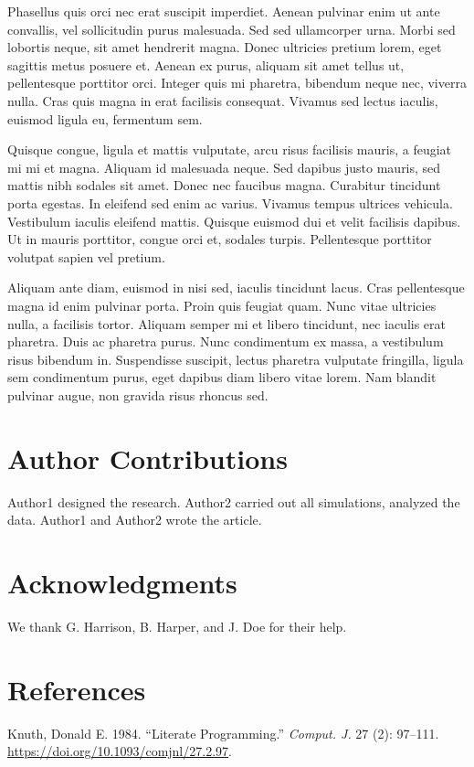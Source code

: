 \documentclass[
  oneside,
  open=any]{scrbook}
\newlength{\cslhangindent}
\newenvironment{CSLReferences}[2] %
 {\begin{list}{}{%
  \setlength{\itemindent}{0pt}
  \setlength{\leftmargin}{0pt}
  \setlength{\parsep}{0pt}
  \ifodd #1
   \setlength{\leftmargin}{\cslhangindent}
   \setlength{\itemindent}{-1\cslhangindent}
  \fi
  \setlength{\itemsep}{#2\baselineskip}}}
 {\end{list}}
\begin{document}
Phasellus quis orci nec erat suscipit imperdiet. Aenean pulvinar enim ut
ante convallis, vel sollicitudin purus malesuada. Sed sed ullamcorper
urna. Morbi sed lobortis neque, sit amet hendrerit magna. Donec
ultricies pretium lorem, eget sagittis metus posuere et. Aenean ex
purus, aliquam sit amet tellus ut, pellentesque porttitor orci. Integer
quis mi pharetra, bibendum neque nec, viverra nulla. Cras quis magna in
erat facilisis consequat. Vivamus sed lectus iaculis, euismod ligula eu,
fermentum sem.

Quisque congue, ligula et mattis vulputate, arcu risus facilisis mauris,
a feugiat mi mi et magna. Aliquam id malesuada neque. Sed dapibus justo
mauris, sed mattis nibh sodales sit amet. Donec nec faucibus magna.
Curabitur tincidunt porta egestas. In eleifend sed enim ac varius.
Vivamus tempus ultrices vehicula. Vestibulum iaculis eleifend mattis.
Quisque euismod dui et velit facilisis dapibus. Ut in mauris porttitor,
congue orci et, sodales turpis. Pellentesque porttitor volutpat sapien
vel pretium.

Aliquam ante diam, euismod in nisi sed, iaculis tincidunt lacus. Cras
pellentesque magna id enim pulvinar porta. Proin quis feugiat quam. Nunc
vitae ultricies nulla, a facilisis tortor. Aliquam semper mi et libero
tincidunt, nec iaculis erat pharetra. Duis ac pharetra purus. Nunc
condimentum ex massa, a vestibulum risus bibendum in. Suspendisse
suscipit, lectus pharetra vulputate fringilla, ligula sem condimentum
purus, eget dapibus diam libero vitae lorem. Nam blandit pulvinar augue,
non gravida risus rhoncus sed.

\chapter{Author Contributions}\label{author-contributions}

Author1 designed the research. Author2 carried out all simulations,
analyzed the data. Author1 and Author2 wrote the article.

\chapter{Acknowledgments}\label{acknowledgments}

We thank G. Harrison, B. Harper, and J. Doe for their help.

\chapter{References}\label{references}

\label{refs}
\begin{CSLReferences}{1}{0}
Knuth, Donald E. 1984. {``Literate Programming.''} \emph{Comput. J.} 27
(2): 97--111. \url{https://doi.org/10.1093/comjnl/27.2.97}.

\end{CSLReferences}


\backmatter
\end{document}
